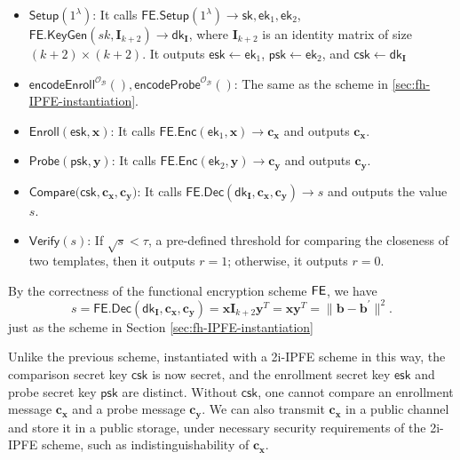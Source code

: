 \begin{itemize}

	\item $\textsf{Setup}(1^\lambda)$: It calls $\textsf{FE.Setup}(1^\lambda) \to \textsf{sk}, \textsf{ek}_1, \textsf{ek}_2$, $ \textsf{FE.KeyGen}(sk, \mathbf{I}_{k+2}) \to \textsf{dk}_{\mathbf{I}} $, where $\mathbf{I}_{k+2}$ is an identity matrix of size $(k+2) \times (k+2)$. It outputs $\textsf{esk} \gets \textsf{ek}_1$, $\textsf{psk} \gets \textsf{ek}_2$, and $\textsf{csk} \gets \textsf{dk}_{\mathbf{I}}$

	\item $\textsf{encodeEnroll}^{\mathcal{O}_{\mathcal{B}}}(), \textsf{encodeProbe}^{\mathcal{O}_{\mathcal{B}}}()$: The same as the scheme in \ref{sec:fh-IPFE-instantiation}. 

	\item $\textsf{Enroll}(\textsf{esk}, \mathbf{x})$: It calls $\textsf{FE.Enc}(\textsf{ek}_1, \mathbf{x}) \to \mathbf{c_x}$ and outputs $\mathbf{c_x}$.

	\item $\textsf{Probe}(\textsf{psk}, \mathbf{y})$: It calls $\textsf{FE.Enc}(\textsf{ek}_2, \mathbf{y}) \to \mathbf{c_y}$ and outputs $\mathbf{c_y}$.

	\item $\textsf{Compare}(\textsf{csk}, \mathbf{c_x}, \mathbf{c_y)}$: It calls $\textsf{FE.Dec}(\textsf{dk}_{\mathbf{I}}, \mathbf{c_x}, \mathbf{c_y}) \to s$ and outputs the value $s$.

	\item $\textsf{Verify}(s)$: If $\sqrt{s} < \tau$, a pre-defined threshold for comparing the closeness of two templates, then it outputs $r = 1$; otherwise, it outputs $r = 0$.

\end{itemize}

By the correctness of the functional encryption scheme $\sf FE$, we have
\[
	s = \textsf{FE.Dec}(\textsf{dk}_{\mathbf{I}}, \mathbf{c_x}, \mathbf{c_y}) =  \mathbf{x} \mathbf{I}_{k+2} \mathbf{y}^T = \mathbf{x} \mathbf{y}^T = \| \mathbf{b} - \mathbf{b}^\prime \|^2.
\]
just as the scheme in Section \ref{sec:fh-IPFE-instantiation}


Unlike the previous scheme, instantiated with a 2i-IPFE scheme in this way, the comparison secret key $\textsf{csk}$ is now secret, and the enrollment secret key $\textsf{esk}$ and probe secret key $\textsf{psk}$ are distinct. Without $\textsf{csk}$, one cannot compare an enrollment message $\mathbf{c_x}$ and a probe message $\mathbf{c_y}$. We can also transmit $\mathbf{c_x}$ in a public channel and store it in a public storage, under necessary security requirements of the 2i-IPFE scheme, such as indistinguishability of $\mathbf{c_x}$.

